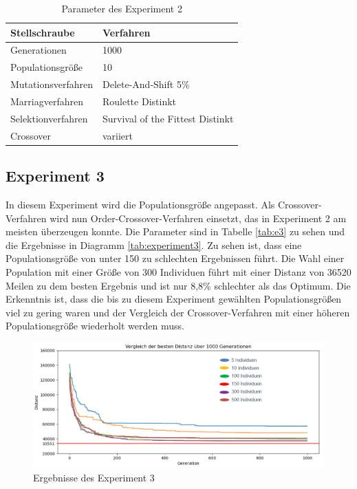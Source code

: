 \begin{table}[H]
\centering
\caption{Parameter des Experiment 2}
\begin{tabular}{ll}
Stellschraube & Verfahren \\
\hline
Generationen & 1000 \\
Populationsgröße & 10 \\
Mutationsverfahren & Delete-And-Shift 5\% \\
Marriagverfahren & Roulette Distinkt \\
Selektionverfahren & Survival of the Fittest Distinkt \\
Crossover & variiert
\end{tabular}
\label{tab:e2}
\end{table}

\subsection{Experiment 3}
In diesem Experiment wird die Populationsgröße angepasst. Als Crossover-Verfahren wird nun Order-Crossover-Verfahren einsetzt, das in Experiment 2 am meisten überzeugen konnte.
Die Parameter sind in Tabelle \ref{tab:e3} zu sehen und die Ergebnisse in Diagramm \ref{tab:experiment3}. Zu sehen ist, dass eine Populationsgröße von unter 150 zu schlechten Ergebnissen führt. Die Wahl einer Population mit einer Größe von 300 Individuen führt mit einer Distanz von 36520 Meilen zu dem besten Ergebnis und ist nur 8,8\% schlechter als das Optimum. Die Erkenntnis ist, dass die bis zu diesem Experiment gewählten Populationsgrößen viel zu gering waren und der Vergleich der Crossover-Verfahren mit einer höheren Populationsgröße wiederholt werden muss.

\begin{figure}[H]
\centering
\includegraphics[width=1\textwidth]{img/Vortrag/experiment3.png}
\caption{Ergebnisse des Experiment 3}
\label{fig:experiment3}
\end{figure}

